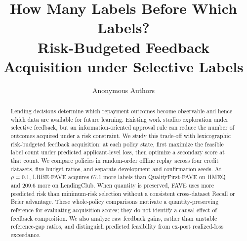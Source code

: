 \documentclass[runningheads]{llncs}
\title{How Many Labels Before Which Labels?\texorpdfstring{\\}{: }Risk-Budgeted Feedback Acquisition under Selective Labels}
\author{Anonymous Authors}
\institute{Anonymous Institution}
\begin{document}
\maketitle
\begin{abstract}
Lending decisions determine which repayment outcomes become observable and hence which data are available for future learning. Existing work studies exploration under selective feedback, but an information-oriented approval rule can reduce the number of outcomes acquired under a risk constraint. We study this trade-off with lexicographic risk-budgeted feedback acquisition: at each policy state, first maximize the feasible label count under predicted applicant-level loss, then optimize a secondary score at that count. We compare policies in random-order offline replay across four credit datasets, five budget ratios, and separate development and confirmation seeds. At $\rho=0.1$, LRBE-FAVE acquires 67.1 more labels than QualityFirst-FAVE on HMEQ and 209.6 more on LendingClub. When quantity is preserved, FAVE uses more predicted risk than minimum-risk selection without a consistent cross-dataset Recall or Brier advantage. These whole-policy comparisons motivate a quantity-preserving reference for evaluating acquisition scores; they do not identify a causal effect of feedback composition. We also analyze raw feedback gains, rather than unstable reference-gap ratios, and distinguish predicted feasibility from ex-post realized-loss exceedance.
\end{abstract}









\end{document}

